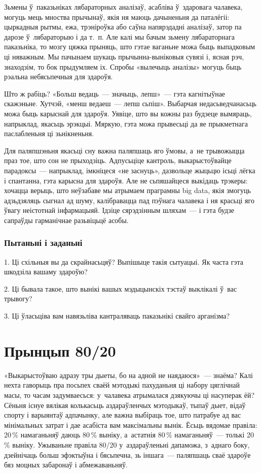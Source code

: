 Зьмены ў~паказьніках лябараторных аналізаў, асабліва ў~здаровага чалавека, могуць мець мноства прычынаў, якія ня маюць дачыненьня да паталёгіі: цыркадныя рытмы, ежа, трэніроўка або саўна напярэдадні аналізаў, затор па дарозе ў~лябараторыю і да т.~п. Але калі мы бачым зьмену лябараторнага паказьніка, то мозгу цяжка прыняць, што гэтае ваганьне можа быць выпадковым ці няважным. Мы пачынаем шукаць прычынна-выніковыя сувязі і, ясная рэч, знаходзім, то бок прыдумляем іх. Спробы «вылечыць аналізы» могуць быць рэальна небясьпечныя для здароўя.

Што ж рабіць? «Больш ведаць~--- значыць, лепш»~--- гэта кагнітыўнае скажэньне. Хутчэй, «менш ведаеш~--- лепш сьпіш». Выбарчая недасьведчанасьць можа быць карыснай для здароўя. Уявіце, што вы кожны раз будзеце вымяраць, напрыклад, якасьць эрэкцыі. Мяркую, гэта можа прывесьці да яе прыкметнага паслабленьня ці зьнікненьня.

Для паляпшэньня якасьці сну важна паляпшаць яго ўмовы, а~не трывожыцца праз тое, што сон не прыходзіць. Адпусьціце кантроль, выкарыстоўвайце парадоксы~--- напрыклад, імкніцеся «не заснуць», дазвольце жыцьцю ісьці лёгка і спантанна, гэта карысна для здароўя. Але не сьпяшайцеся выкідаць трэкеры: хочацца верыць, што неўзабаве мы атрымаем праграмны big data, якія змогуць адзьдзяляць сыгнал ад шуму, калібравацца пад пэўнага чалавека і ня красьці яго ўвагу неістотнай інфармацыяй. Ідзіце сярэдзінным шляхам~--- і гэта будзе сапраўды гарманічнае разьвіцьцё асобы.

\subsubsection{Пытаньні і заданьні}

1. Ці схільныя вы да скрайнасьцяў? Выпішыце такія сытуацыі. Як часта гэта шкодзіла вашаму здароўю?

2. Ці бывала такое, што вынікі вашых мэдыцынскіх тэстаў выклікалі ў~вас трывогу?

3. Ці ўласьціва вам навязьліва кантраляваць паказьнікі свайго арганізма?


\section{Прынцып 80/20}


«Выкарыстоўваю адразу тры дыеты, бо на адной не наядаюся»~--- знаёма? Калі нехта гаворыць пра посьпех сваёй мэтодыкі пахуданьня ці набору цяглічнай масы, то часам задумваесься: у~чалавека атрымалася дзякуючы ці насуперак ёй? Сёньня існуе вялікая колькасьць аздараўленчых мэтодыкаў, тыпаў дыет, відаў спорту і варыянтаў адпачынку, але важна выбіраць тое, што патрабуе ад вас мінімальных затрат і дае асабіста вам максімальны вынік. Ёсьць вядомае правіла: 20\,\% намаганьняў даюць 80\,\% выніку, а~астатнія 80\,\% намаганьняў~--- толькі 20\,\% выніку. Ужываньне правіла 80/20 у~аздараўленьні дапаможа, з~аднаго боку, дзейнічаць больш эфэктыўна і бясьпечна, зь іншага~--- паляпшаць сваё здароўе бяз моцных забаронаў і абмежаваньняў.

